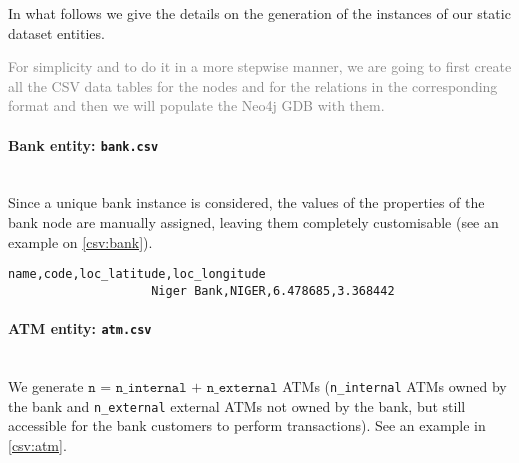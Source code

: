 In what follows we give the details on the generation of the instances of our static dataset entities.

\textcolor{gray}{
For simplicity and to do it in a more stepwise manner, we are going to first create all the CSV data tables for the nodes and for the relations in the corresponding format and then we will populate the Neo4j GDB with them.}

\paragraph{Bank entity: \texttt{bank.csv}\\\\}

Since a unique bank instance is considered, the values of the properties of the bank node are manually assigned, leaving them completely customisable (see an example on \ref{csv:bank}).

\begin{center}
\lstset{style=csvStyle}
\begin{lstlisting}[caption={Example of a bank.csv}, label={csv:bank}]
                    name,code,loc_latitude,loc_longitude
                    Niger Bank,NIGER,6.478685,3.368442
\end{lstlisting}
\end{center}

\paragraph{ATM entity: \texttt{atm.csv}\\\\}

We generate $\texttt{n = n\_internal + n\_external}$ ATMs (\texttt{n\_internal} ATMs owned by the bank and \texttt{n\_external} external ATMs not owned by the bank, but still accessible
for the bank customers to perform transactions). See an example in \ref{csv:atm}.

